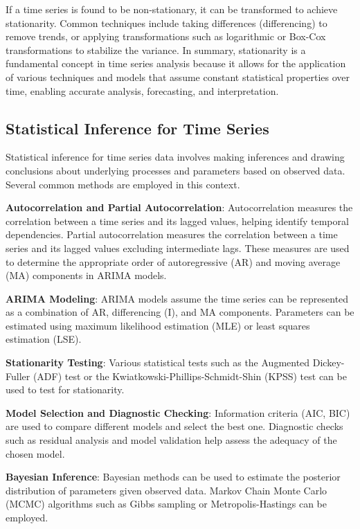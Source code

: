 \documentclass[11pt,a4paper]{article}
\begin{document}
If a time series is found to be non-stationary, it can be transformed to achieve stationarity. Common techniques include taking differences (differencing) to remove trends, or applying transformations such as logarithmic or Box-Cox transformations to stabilize the variance. In summary, stationarity is a fundamental concept in time series analysis because it allows for the application of various techniques and models that assume constant statistical properties over time, enabling accurate analysis, forecasting, and interpretation.

\subsection{Statistical Inference for Time Series}

Statistical inference for time series data involves making inferences and drawing conclusions about underlying processes and parameters based on observed data. Several common methods are employed in this context.

\textbf{Autocorrelation and Partial Autocorrelation}: Autocorrelation measures the correlation between a time series and its lagged values, helping identify temporal dependencies. Partial autocorrelation measures the correlation between a time series and its lagged values excluding intermediate lags. These measures are used to determine the appropriate order of autoregressive (AR) and moving average (MA) components in ARIMA models.

\textbf{ARIMA Modeling}: ARIMA models assume the time series can be represented as a combination of AR, differencing (I), and MA components. Parameters can be estimated using maximum likelihood estimation (MLE) or least squares estimation (LSE).

\textbf{Stationarity Testing}: Various statistical tests such as the Augmented Dickey-Fuller (ADF) test or the Kwiatkowski-Phillips-Schmidt-Shin (KPSS) test can be used to test for stationarity.

\textbf{Model Selection and Diagnostic Checking}: Information criteria (AIC, BIC) are used to compare different models and select the best one. Diagnostic checks such as residual analysis and model validation help assess the adequacy of the chosen model.

\textbf{Bayesian Inference}: Bayesian methods can be used to estimate the posterior distribution of parameters given observed data. Markov Chain Monte Carlo (MCMC) algorithms such as Gibbs sampling or Metropolis-Hastings can be employed.
\end{document}
